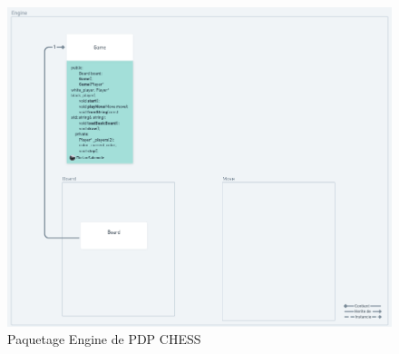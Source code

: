 \huge\documentclass{article}
\begin{document}
\begin{figure}[!h]
    \centering
    \includegraphics[scale = 0.3]{img/Package/Engine.png}
    \caption{Paquetage Engine de PDP CHESS}
    \label{pck:engine}
\end{figure}

\newpage
\end{document}
